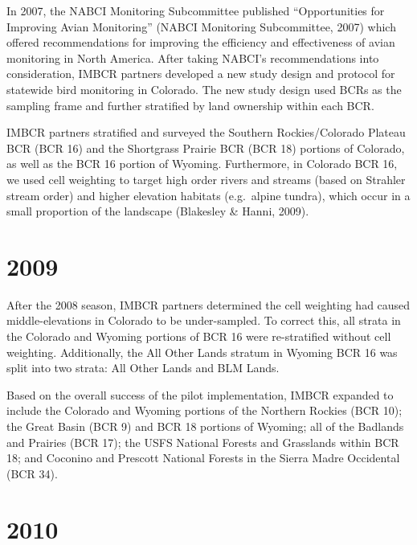 \documentclass[
  letterpaper,
  DIV=11,
  numbers=noendperiod,
  oneside]{scrreprt}
\begin{document}
In 2007, the NABCI Monitoring Subcommittee published ``Opportunities for
Improving Avian Monitoring'' (NABCI Monitoring Subcommittee, 2007) which
offered recommendations for improving the efficiency and effectiveness
of avian monitoring in North America. After taking NABCI's
recommendations into consideration, IMBCR partners developed a new study
design and protocol for statewide bird monitoring in Colorado. The new
study design used BCRs as the sampling frame and further stratified by
land ownership within each BCR.

IMBCR partners stratified and surveyed the Southern Rockies/Colorado
Plateau BCR (BCR 16) and the Shortgrass Prairie BCR (BCR 18) portions of
Colorado, as well as the BCR 16 portion of Wyoming. Furthermore, in
Colorado BCR 16, we used cell weighting to target high order rivers and
streams (based on Strahler stream order) and higher elevation habitats
(e.g.~alpine tundra), which occur in a small proportion of the landscape
(Blakesley \& Hanni, 2009).

\hypertarget{section}{%
\section*{\texorpdfstring{\textbf{2009}}{2009}}\label{section}}


After the 2008 season, IMBCR partners determined the cell weighting had
caused middle-elevations in Colorado to be under-sampled. To correct
this, all strata in the Colorado and Wyoming portions of BCR 16 were
re-stratified without cell weighting. Additionally, the All Other Lands
stratum in Wyoming BCR 16 was split into two strata: All Other Lands and
BLM Lands.

Based on the overall success of the pilot implementation, IMBCR expanded
to include the Colorado and Wyoming portions of the Northern Rockies
(BCR 10); the Great Basin (BCR 9) and BCR 18 portions of Wyoming; all of
the Badlands and Prairies (BCR 17); the USFS National Forests and
Grasslands within BCR 18; and Coconino and Prescott National Forests in
the Sierra Madre Occidental (BCR 34).

\hypertarget{section-1}{%
\section*{\texorpdfstring{\textbf{2010}}{2010}}\label{section-1}}
\end{document}
